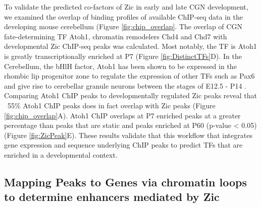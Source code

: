 \documentclass[fleqn,10pt,twocolumn]{wlscirep}
\begin{document}
To validate the predicted co-factors of Zic in early and late CGN development, we examined the overlap of binding profiles of available ChIP-seq data in the developing mouse cerebellum  (Figure \ref{fig:chip_overlap}. The overlap of CGN fate-determining TF Atoh1, chromatin remodelers Chd4 and Chd7 with developmental Zic ChIP-seq peaks was calculated. Most notably, the TF is Atoh1 is greatly transcriptionally enriched at P7 (Figure \ref{fig:DistinctTFs}D). In the Cerebellum, the bHlH factor, Atoh1 has been shown to be expressed in the rhombic lip progenitor zone to regulate the expression of other TFs such as Pax6 and give rise to cerebellar granule neurons between the stages of E12.5 - P14 \cite{Aruga2018ZicDisease, Yeung2014WlsDevelopment, Wang2005Math1Cerebellum, Ben-Arie1997Math1Neurons}. Comparing Atoh1 ChIP peaks to developmentally regulated Zic peaks reveal that ~55\%  Atoh1 ChIP peaks does in fact overlap with Zic peaks (Figure \ref{fig:chip_overlap}A). Atoh1 ChIP overlaps at P7 enriched peaks at a greater percentage than peaks that are static and peaks enriched at P60 (p-value < 0.05) (Figure \ref{fig:ZicPeak}E). These results validate that this workflow that integrates gene expression and sequence underlying ChIP peaks to predict TFs that are enriched in a developmental context.





\subsection*{Mapping Peaks to Genes via chromatin loops to determine enhancers mediated by Zic}
\end{document}
